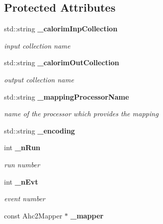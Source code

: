 \subsection*{Protected Attributes}
\begin{DoxyCompactItemize}
\item 
std\-::string {\bf \-\_\-calorim\-Inp\-Collection}\label{classCALICE_1_1Ahc2TriggeredChannels_a19d95908c195bb589969afd9d048f6a7}

\begin{DoxyCompactList}\small\item\em input collection name \end{DoxyCompactList}\item 
std\-::string {\bf \-\_\-calorim\-Out\-Collection}\label{classCALICE_1_1Ahc2TriggeredChannels_a294266c133fee81756d0f9527674bfd0}

\begin{DoxyCompactList}\small\item\em output collection name \end{DoxyCompactList}\item 
std\-::string {\bf \-\_\-mapping\-Processor\-Name}\label{classCALICE_1_1Ahc2TriggeredChannels_a2f22fbbf8a80f45c129b0f320de3ab3f}

\begin{DoxyCompactList}\small\item\em name of the processor which provides the mapping \end{DoxyCompactList}\item 
std\-::string {\bfseries \-\_\-encoding}\label{classCALICE_1_1Ahc2TriggeredChannels_a319667772397941987ed6bc4076b224f}

\item 
int {\bf \-\_\-n\-Run}\label{classCALICE_1_1Ahc2TriggeredChannels_acabca64049bc0ceadd8df49e73296e57}

\begin{DoxyCompactList}\small\item\em run number \end{DoxyCompactList}\item 
int {\bf \-\_\-n\-Evt}\label{classCALICE_1_1Ahc2TriggeredChannels_a5aa48858e4e0f6c4c0dc055b103181d0}

\begin{DoxyCompactList}\small\item\em event number \end{DoxyCompactList}\item 
const Ahc2\-Mapper $\ast$ {\bf \-\_\-mapper}\label{classCALICE_1_1Ahc2TriggeredChannels_a793ad95889916074bce275e4671f58b5}


\end{DoxyCompactItemize}
